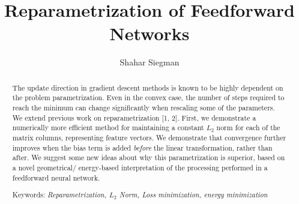 \documentclass[]{article}
\title{Reparametrization of Feedforward Networks}
\author{Shahar Siegman}
\begin{document}
\maketitle

\begin{abstract}
The update direction in gradient descent methods is known to be highly dependent on the problem parametrization. Even in the convex case, the number of steps required to reach the minimum can change significantly when rescaling some of the parameters. We extend previous work on reparametrization [1, 2]. First, we demonstrate a numerically more efficient method for maintaining a constant $L_2$ norm for each of the matrix columns, representing feature vectors. We demonstrate that convergence further improves when the bias term is added \textit{before} the linear transformation, rather than after. We suggest some new ideas about why this parametrization is superior, based on a novel geometrical/ energy-based interpretation of the processing performed in a feedforward neural network.

Keywords: \textit{Reparametrization, $L_2$ Norm, Loss minimization, energy minimization}
\end{abstract}

\section{}
\end{document}
